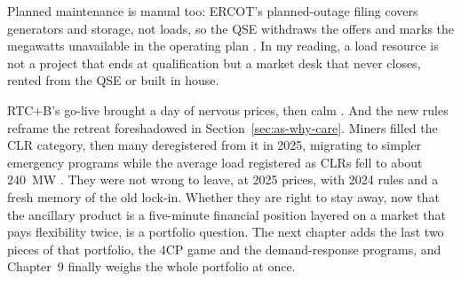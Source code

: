 Planned maintenance is manual too: ERCOT's planned-outage filing covers generators and storage, not loads, so the QSE withdraws the offers and marks the megawatts unavailable in the operating plan \autocite{ercot2026protocols}. %
In my reading, a load resource is not a project that ends at qualification but a market desk that never closes, rented from the QSE or built in house.

RTC+B's go-live brought a day of nervous prices, then calm \autocite{potomac2026somercot}. %
And the new rules reframe the retreat foreshadowed in Section~\ref{sec:as-why-care}. Miners filled the CLR category, then many deregistered from it in 2025, migrating to simpler emergency programs while the average load registered as CLRs fell to about 240~MW \autocite{potomac2026somercot}. %
They were not wrong to leave, at 2025 prices, with 2024 rules and a fresh memory of the old lock-in. Whether they are right to stay away, now that the ancillary product is a five-minute financial position layered on a market that pays flexibility twice, is a portfolio question. The next chapter adds the last two pieces of that portfolio, the 4CP game and the demand-response programs, and Chapter~9 finally weighs the whole portfolio at once.
